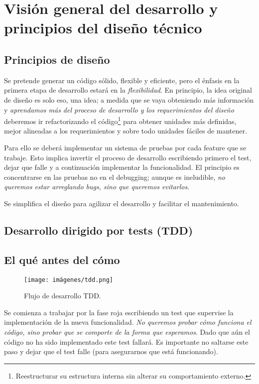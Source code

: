 
\section{Visión general del desarrollo y principios del diseño técnico}\label{principios:vision-general-desarrollo}

\subsection{Principios de diseño}\label{principios:principios-de-diseno}
Se pretende generar un código sólido, flexible y eficiente, pero el énfasis en la primera etapa de desarrollo estará en la \emph{flexibilidad}. En principio, la idea original de diseño es solo eso, una idea; a medida que se vaya obteniendo más información y \emph{aprendamos más del proceso de desarrollo y los requerimientos del diseño} deberemos ir refactorizando el código\footnote{Reestructurar su estructura interna sin alterar su comportamiento externo.} para obtener unidades más definidas, mejor alineadas a los requerimientos y sobre todo unidades fáciles de mantener.

Para ello se deberá implementar un sistema de pruebas por cada feature que se trabaje. Esto implica invertir el proceso de desarrollo escribiendo primero el test, dejar que falle y a continuación implementar la funcionalidad. El principio es concentrarse en las pruebas no en el \foreignlanguage{english}{debugging}; aunque es ineludible, \emph{no queremos estar arreglando bugs, sino que queremos evitarlos}.

Se simplifica el diseño para agilizar el desarrollo y facilitar el mantenimiento.

\subsection{Desarrollo dirigido por tests (TDD)}\label{principios:TDD}
\subsection*{El qué antes del cómo}

\begin{figure}[ht]
	\centering
	\texttt{[image: imágenes/tdd.png]}
	\caption{Flujo de desarrollo TDD.}
\end{figure}

Se comienza a trabajar por la fase roja escribiendo un test que supervise la implementación de la nueva funcionalidad. \emph{No queremos probar cómo funciona el código, sino probar que se comporte de la forma que esperamos}. Dado que aún el código no ha sido implementado este test fallará. Es importante no saltarse este paso y dejar que el test falle (para asegurarnos que está funcionando).

